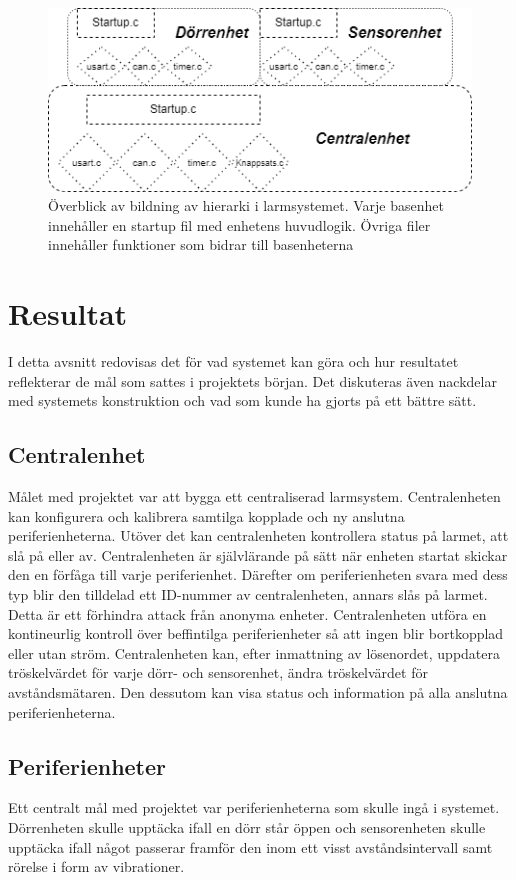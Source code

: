 \documentclass{article}
\begin{document}
\begin{figure}[h]
    \centering
    \includegraphics[scale=0.5]{Projektrapport/hierarki.png}
    \caption {Överblick av bildning av hierarki i larmsystemet. Varje basenhet innehåller en startup fil med enhetens huvudlogik. Övriga filer innehåller funktioner som bidrar till basenheterna}
    \label{fig:drawing}
\end{figure}


\section{Resultat}
I detta avsnitt redovisas det för vad systemet kan göra och hur resultatet reflekterar de mål som sattes i projektets början. 
Det diskuteras även nackdelar med systemets konstruktion och vad som kunde ha gjorts på ett bättre sätt.

\subsection{Centralenhet}
Målet med projektet var att bygga ett centraliserad larmsystem. Centralenheten kan konfigurera och kalibrera samtilga kopplade och ny anslutna periferienheterna. Utöver det kan centralenheten kontrollera status på larmet, att slå på eller av. Centralenheten är självlärande på sätt när enheten startat skickar den en förfåga till varje periferienhet. Därefter om 
periferienheten svara med dess typ blir den tilldelad ett ID-nummer av centralenheten, annars slås på larmet. Detta är ett förhindra attack från anonyma enheter. Centralenheten utföra en kontineurlig kontroll över beffintilga periferienheter så att ingen blir bortkopplad eller utan ström. Centralenheten kan, efter inmattning av lösenordet, uppdatera tröskelvärdet för varje dörr- och sensorenhet, ändra tröskelvärdet för avståndsmätaren. Den dessutom kan visa status och information på alla anslutna periferienheterna.

\subsection{Periferienheter}
Ett centralt mål med projektet var periferienheterna som skulle ingå i systemet. 
Dörrenheten skulle upptäcka ifall en dörr står öppen och sensorenheten skulle upptäcka ifall något passerar framför den inom ett visst avståndsintervall samt rörelse i form av vibrationer.
\end{document}
